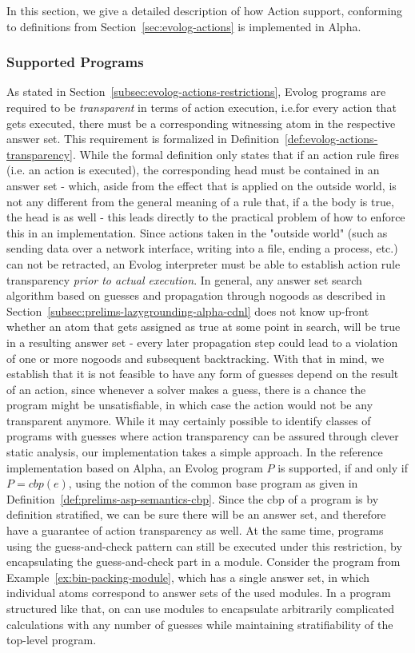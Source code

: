 In this section, we give a detailed description of how Action support, conforming to definitions from Section~\ref{sec:evolog-actions} is implemented in Alpha.

\subsubsection{Supported Programs}
\label{subsubsec:implementation-actions-support}
As stated in Section~\ref{subsec:evolog-actions-restrictions}, Evolog programs are required to be \emph{transparent} in terms of action execution, i.e.for every action that gets executed, there must be a corresponding witnessing atom in the respective answer set. This requirement is formalized in Definition~\ref{def:evolog-actions-transparency}. While the formal definition only states that if an action rule fires (i.e. an action is executed), the corresponding head must be contained in an answer set - which, aside from the effect that is applied on the outside world, is not any different from the general meaning of a rule that, if a the body is true, the head is as well - this leads directly to the practical problem of how to enforce this in an implementation. Since actions taken in the "outside world" (such as sending data over a network interface, writing into a file, ending a process, etc.) can not be retracted, an Evolog interpreter must be able to establish action rule transparency \emph{prior to actual execution}. In general, any answer set search algorithm based on guesses and propagation through nogoods as described in Section~\ref{subsec:prelims-lazygrounding-alpha-cdnl} does not know up-front whether an atom that gets assigned as true at some point in search, will be true in a resulting answer set - every later propagation step could lead to a violation of one or more nogoods and subsequent backtracking. With that in mind, we establish that it is not feasible to have any form of guesses depend on the result of an action, since whenever a solver makes a guess, there is a chance the program might be unsatisfiable, in which case the action would not be any transparent anymore. While it may certainly possible to identify classes of programs with guesses where action transparency can be assured through clever static analysis, our implementation takes a simple approach. In the reference implementation based on Alpha, an Evolog program $P$ is supported, if and only if $P = cbp(e)$, using the notion of the common base program as given in Definition~\ref{def:prelims-asp-semantics-cbp}. Since the \gls{cbp} of a program is by definition stratified, we can be sure there will be an answer set, and therefore have a guarantee of action transparency as well. At the same time, programs using the guess-and-check pattern can still be executed under this restriction, by encapsulating the guess-and-check part in a module. Consider the program from Example~\ref{ex:bin-packing-module}, which has a single answer set, in which individual atoms correspond to answer sets of the used modules. In a program structured like that, on can use modules to encapsulate arbitrarily complicated calculations with any number of guesses while maintaining stratifiability of the top-level program.


